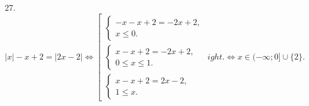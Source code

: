 27. $|x|-x+2=|2x-2|\Leftrightarrow \left[\begin{array}{l}\begin{cases} -x-x+2=-2x+2,\\ x\leqslant 0.\end{cases}\\
\begin{cases} x-x+2=-2x+2,\\ 0\leqslant x\leqslant 1 .\end{cases}\\\begin{cases} x-x+2=2x-2,\\ 1\leqslant x.\end{cases}\end{array}
ight.\Leftrightarrow
x\in (-\infty;0]\cup\{2\}.$\\
